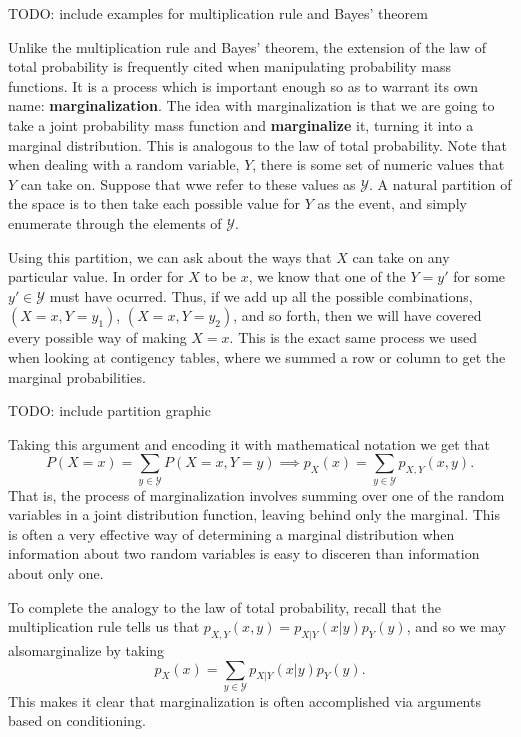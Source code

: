 \documentclass[
  letterpaper,
  DIV=11,
  numbers=noendperiod]{scrreprt}
\begin{document}
TODO: include examples for multiplication rule and Bayes' theorem

Unlike the multiplication rule and Bayes' theorem, the extension of the
law of total probability is frequently cited when manipulating
probability mass functions. It is a process which is important enough so
as to warrant its own name: \textbf{marginalization}. The idea with
marginalization is that we are going to take a joint probability mass
function and \textbf{marginalize} it, turning it into a marginal
distribution. This is analogous to the law of total probability. Note
that when dealing with a random variable, \(Y\), there is some set of
numeric values that \(Y\) can take on. Suppose that wwe refer to these
values as \(\mathcal{Y}\). A natural partition of the space is to then
take each possible value for \(Y\) as the event, and simply enumerate
through the elements of \(\mathcal{Y}\).

Using this partition, we can ask about the ways that \(X\) can take on
any particular value. In order for \(X\) to be \(x\), we know that one
of the \(Y=y'\) for some \(y'\in\mathcal{Y}\) must have ocurred. Thus,
if we add up all the possible combinations, \((X=x,Y=y_1)\),
\((X=x,Y=y_2)\), and so forth, then we will have covered every possible
way of making \(X=x\). This is the exact same process we used when
looking at contigency tables, where we summed a row or column to get the
marginal probabilities.

TODO: include partition graphic

Taking this argument and encoding it with mathematical notation we get
that
\[P(X=x) = \sum_{y\in\mathcal{Y}} P(X=x, Y=y) \implies p_X(x) = \sum_{y\in\mathcal{Y}} p_{X,Y}(x,y).\]
That is, the process of marginalization involves summing over one of the
random variables in a joint distribution function, leaving behind only
the marginal. This is often a very effective way of determining a
marginal distribution when information about two random variables is
easy to disceren than information about only one.

To complete the analogy to the law of total probability, recall that the
multiplication rule tells us that \(p_{X,Y}(x,y) = p_{X|Y}(x|y)p_Y(y)\),
and so we may alsomarginalize by taking
\[p_X(x) = \sum_{y\in\mathcal{Y}} p_{X|Y}(x|y)p_Y(y).\] This makes it
clear that marginalization is often accomplished via arguments based on
conditioning.
\end{document}
